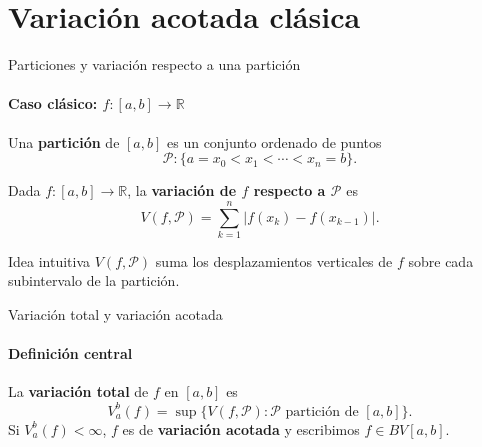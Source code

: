 \section{Variación acotada clásica}


\begin{frame}{Particiones y variación respecto a una partición}
\framesubtitle{Caso clásico: $f:[a,b]\to\mathbb{R}$}

Una \textbf{partición} de $[a,b]$ es un conjunto ordenado de puntos
\[
\mathcal{P}\colon \{ a = x_0 < x_1 < \cdots < x_n = b \}.
\]

\medskip

Dada $f:[a,b]\to \mathbb{R}$, la \textbf{variación de $f$ respecto a $\mathcal{P}$} es
\[
V(f,\mathcal{P})=\sum_{k=1}^n \bigl|f(x_k)-f(x_{k-1})\bigr|.
\]

\medskip

\begin{alertblock}{Idea intuitiva}
$V(f,\mathcal{P})$ suma los desplazamientos verticales de $f$ sobre cada
subintervalo de la partición.
\end{alertblock}

\end{frame}


\begin{frame}{Variación total y variación acotada}
\framesubtitle{Definición central}

\begin{definition}
La \textbf{variación total} de $f$ en $[a,b]$ es
\[
V_a^b(f)=\sup\bigl\{ V(f,\mathcal{P}) : \mathcal{P} \text{ partición de } [a,b]\bigr\}.
\]
Si $V_a^b(f)<\infty$, $f$ es de \textbf{variación acotada} y escribimos
$f\in BV[a,b]$.
\end{definition}

\end{frame}


